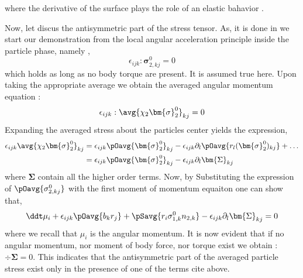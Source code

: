 


where the derivative of the surface plays the role of an elastic bahavior \citet[appendix A]{batchelor1970stress}.

Now, let discus the antisymmetric part of the stress tensor. 
As, it is done in \cite{dolata2020heterogeneous} we start our demonstration from the local angular acceleration principle inside the particle phase, namely \cite[chapter 2]{leal2007advanced},
\begin{equation}
    \epsilon_{ijk} : \bm{\sigma}_{2,kj}^0 = 0 
\end{equation}
which holds as long as no body torque are present.
It is assumed true here.  
Upon taking the appropriate average we obtain the averaged angular momentum equation : 
\begin{equation*}
    \epsilon_{ijk} : \avg{\chi_2 \bm{\sigma}_2^0}_{kj} = 0 
\end{equation*}
Expanding the averaged stress about the particles center yields the expression,
\begin{align}
    \label{eq:exp_sigma2}
     \epsilon_{ijk}\avg{\chi_2\bm{\sigma}_2^0}_{kj}
    &=  \epsilon_{ijk}\pOavg{ \bm{\sigma}_2^0}_{kj}
    - \epsilon_{ijk}\partial_l
    \pOavg{ r_l(\bm{\sigma}_2^0)_{kj}}        
    + \ldots  \\
    &=  \epsilon_{ijk}\pOavg{ \bm{\sigma}_2^0}_{kj}
    - \epsilon_{ijk}\partial_l\bm{\Sigma}_{kj}\\
\end{align}
where $\bm{\Sigma}$ contain all the higher order terms. 
Now, by Substituting the expression of $\pOavg{\sigma_{2,kj}^0}$ with the first moment of momentum equaiton one can show that, 
\begin{equation*}
    \ddt \mu_i +  \epsilon_{ijk} \pOavg{b_k r_j}
    + \pSavg{r_i \sigma_{1,k}^0n_{2,k}}
    - \epsilon_{ijk}\partial_l\bm{\Sigma}_{kj} = 0 
\end{equation*}
where we recall that $\mu_i$ is the angular momentum. 
It is now evident that if no angular momentum, nor moment of body force, nor torque exist we obtain : $\div \bm{\Sigma} = 0$.
This indicates that the antisymmetric part of the averaged particle stress exist only in the presence of one of the terms cite above. 

